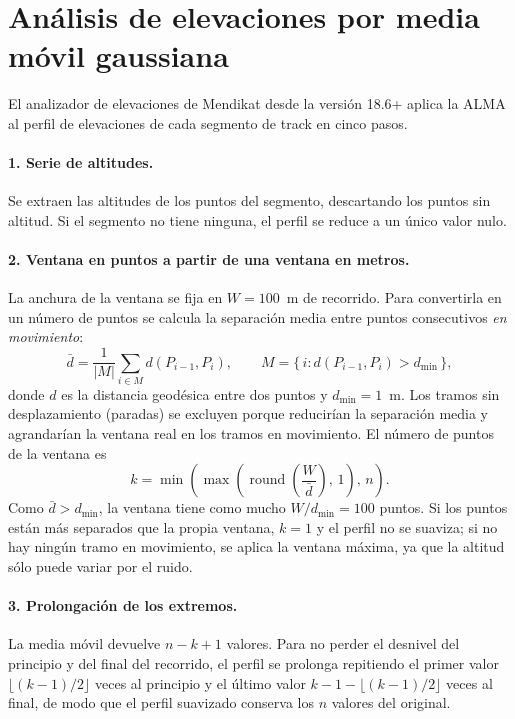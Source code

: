 \documentclass[11pt,a4paper]{article}
\begin{document}
\section{Análisis de elevaciones por media móvil gaussiana}
\label{sec:alma-elevaciones}

El analizador de elevaciones de Mendikat desde la versión 18.6+ aplica la ALMA al
perfil de elevaciones de cada segmento de track en cinco pasos.

\paragraph{1. Serie de altitudes.}
Se extraen las altitudes de los puntos del segmento, descartando los puntos sin
altitud. Si el segmento no tiene ninguna, el perfil se reduce a un único valor
nulo.

\paragraph{2. Ventana en puntos a partir de una ventana en metros.}
La anchura de la ventana se fija en $W = 100$~m de recorrido. Para convertirla
en un número de puntos se calcula la separación media entre puntos
consecutivos \emph{en movimiento}:
\begin{equation}
    \bar{d} = \frac{1}{|M|} \sum_{i \in M} d(P_{i-1}, P_i),
    \qquad
    M = \{\, i : d(P_{i-1}, P_i) > d_{\min} \,\},
\end{equation}
donde $d$ es la distancia geodésica entre dos puntos y $d_{\min} = 1$~m. Los
tramos sin desplazamiento (paradas) se excluyen porque reducirían la separación
media y agrandarían la ventana real en los tramos en movimiento. El número de
puntos de la ventana es
\begin{equation}
    k = \min\left(\max\left(\operatorname{round}\left(\frac{W}{\bar{d}}\right),\, 1\right),\, n\right).
\end{equation}
Como $\bar{d} > d_{\min}$, la ventana tiene como mucho $W/d_{\min} = 100$
puntos. Si los puntos están más separados que la propia ventana, $k = 1$ y el
perfil no se suaviza; si no hay ningún tramo en movimiento, se aplica la
ventana máxima, ya que la altitud sólo puede variar por el ruido.

\paragraph{3. Prolongación de los extremos.}
La media móvil devuelve $n - k + 1$ valores. Para no perder el desnivel del
principio y del final del recorrido, el perfil se prolonga repitiendo el primer
valor $\lfloor (k-1)/2 \rfloor$ veces al principio y el último valor
$k - 1 - \lfloor (k-1)/2 \rfloor$ veces al final, de modo que el perfil
suavizado conserva los $n$ valores del original.
\end{document}
